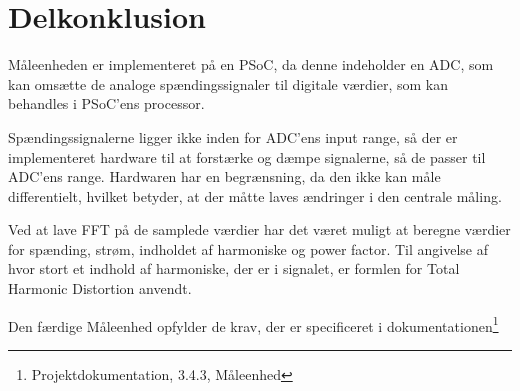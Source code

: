 
\section{Delkonklusion}

Måleenheden er implementeret på en PSoC, da denne indeholder en ADC, som kan omsætte de analoge spændingssignaler til digitale værdier, som kan behandles i PSoC'ens processor. 

Spændingssignalerne ligger ikke inden for ADC'ens input range, så der er implementeret hardware til at forstærke og dæmpe signalerne, så de passer til ADC'ens range. Hardwaren har en begrænsning, da den ikke kan måle differentielt, hvilket betyder, at der måtte laves ændringer i den centrale måling. 

Ved at lave FFT på de samplede værdier har det været muligt at beregne værdier for spænding, strøm, indholdet af harmoniske og power factor. Til angivelse af hvor stort et indhold af harmoniske, der er i signalet, er formlen for Total Harmonic Distortion anvendt.

Den færdige Måleenhed opfylder de krav, der er specificeret i dokumentationen\footnote{Projektdokumentation, 3.4.3, Måleenhed}

